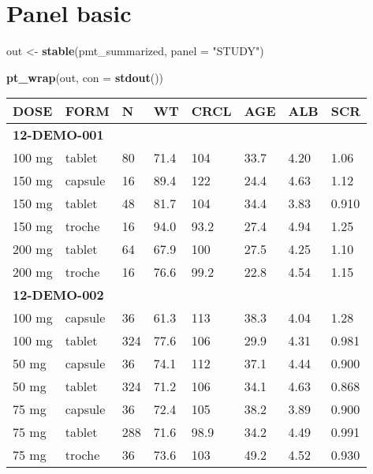 \documentclass[
]{article}
\newenvironment{Shaded}{\begin{snugshade}}{\end{snugshade}}
\newcommand{\DataTypeTok}[1]{\textcolor[rgb]{0.13,0.29,0.53}{#1}}
\newcommand{\KeywordTok}[1]{\textcolor[rgb]{0.13,0.29,0.53}{\textbf{#1}}}
\newcommand{\NormalTok}[1]{#1}
\newcommand{\StringTok}[1]{\textcolor[rgb]{0.31,0.60,0.02}{#1}}
\begin{document}
\clearpage

\hypertarget{panel-basic}{%
\section{Panel basic}\label{panel-basic}}

\begin{Shaded}
\begin{Highlighting}[]
\NormalTok{out <-}\StringTok{ }\KeywordTok{stable}\NormalTok{(pmt_summarized, }\DataTypeTok{panel =} \StringTok{"STUDY"}\NormalTok{)}

\KeywordTok{pt_wrap}\NormalTok{(out, }\DataTypeTok{con =} \KeywordTok{stdout}\NormalTok{()) }
\end{Highlighting}
\end{Shaded}

\begin{table}[h]
\centering
{\def\arraystretch{1.4}\tabcolsep=5pt
\begin{threeparttable}
\begin{tabular}[h]{llllllll}
\hline
DOSE & FORM & N & WT & CRCL & AGE & ALB & SCR \\
\hline
\multicolumn{8}{l}{\textbf{12-DEMO-001}}\\
100 mg & tablet & 80 & 71.4 & 104 & 33.7 & 4.20 & 1.06 \\
150 mg & capsule & 16 & 89.4 & 122 & 24.4 & 4.63 & 1.12 \\
150 mg & tablet & 48 & 81.7 & 104 & 34.4 & 3.83 & 0.910 \\
150 mg & troche & 16 & 94.0 & 93.2 & 27.4 & 4.94 & 1.25 \\
200 mg & tablet & 64 & 67.9 & 100 & 27.5 & 4.25 & 1.10 \\
200 mg & troche & 16 & 76.6 & 99.2 & 22.8 & 4.54 & 1.15 \\
\hline \multicolumn{8}{l}{\textbf{12-DEMO-002}}\\
100 mg & capsule & 36 & 61.3 & 113 & 38.3 & 4.04 & 1.28 \\
100 mg & tablet & 324 & 77.6 & 106 & 29.9 & 4.31 & 0.981 \\
50 mg & capsule & 36 & 74.1 & 112 & 37.1 & 4.44 & 0.900 \\
50 mg & tablet & 324 & 71.2 & 106 & 34.1 & 4.63 & 0.868 \\
75 mg & capsule & 36 & 72.4 & 105 & 38.2 & 3.89 & 0.900 \\
75 mg & tablet & 288 & 71.6 & 98.9 & 34.2 & 4.49 & 0.991 \\
75 mg & troche & 36 & 73.6 & 103 & 49.2 & 4.52 & 0.930 \\
\hline
\end{tabular}
\end{threeparttable}
}
\end{table}
\end{document}
